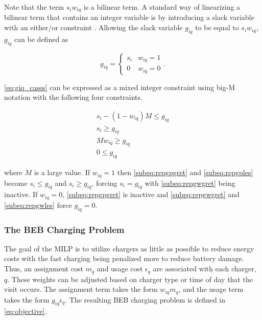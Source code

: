 \documentclass[11pt,a4paper,final]{article}
\begin{document}
Note that the term \(s_i w_{iq}\) is a bilinear term. A standard way of linearizing a bilinear term that contains an
integer variable is by introducing a slack variable with an either/or constraint
\cite[,rodriguez-2013-compar-asses]{chen-2010-applied}. Allowing the slack variable \(g_{iq}\) to be equal to \(s_i w_{iq}\),
\(g_{iq}\) can be defined as

\begin{equation}
    \label{eq:giq_cases}
    g_{iq} =
    \begin{cases}
        s_i & w_{iq} = 1 \\
        0 & w_{iq} = 0
    \end{cases}.
\end{equation}

\autoref{eq:giq_cases} can be expressed as a mixed integer constraint using big-M notation with the following four
constraints.

\begin{subequations}
    \label{eq:slack_gain}
\begin{align}
    s_i - (1 - w_{iq})M \leq g_{iq}  \label{subeq:repgpgret} \\
    s_i \geq g_{iq}                 \label{subeq:repgples} \\
    Mw_{iq} \geq g_{iq}              \label{subeq:repgwgret} \\
    0 \leq g_{iq}                   \label{subeq:repgwles}
\end{align}
\end{subequations}

\noindent
where \(M\) is a large value. If \(w_{iq} = 1\) then \autoref{subeq:repgpgret} and \autoref{subeq:repgples} become \(s_i \leq
g_{iq}\) and \(s_i \geq g_{iq}\), forcing \(s_i = g_{iq}\) with \autoref{subeq:repgwgret} being inactive. If \(w_{iq} = 0\),
\autoref{subeq:repgpgret} is inactive and \autoref{subeq:repgwgret} and \autoref{subeq:repgwles} force \(g_{iq} = 0\).

\subsubsection{The BEB Charging Problem}
\label{sec:BEB_MILP}
The goal of the MILP is to utilize chargers as little as possible to reduce energy costs with the fast charging being
penalized more to reduce battery damage. Thus, an assignment cost \(m_q\) and usage cost \(\epsilon_q\) are associated with each
charger, \(q\). These weights can be adjusted based on charger type or time of day that the visit occurs. The assignment
term takes the form \(w_{iq}m_q\), and the usage term takes the form \(g_{iq} \epsilon_q\). The resulting BEB charging problem is
defined in \autoref{eq:objective}.
\end{document}
